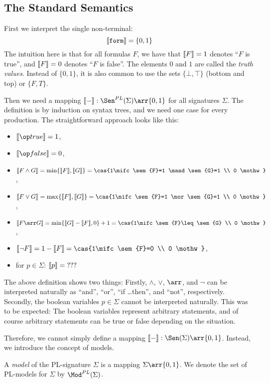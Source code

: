 \subsection{The Standard Semantics}

First we interpret the single non-terminal:
\[\llbracket \mathtt{form}\rrbracket=\{0,1\}\]
The intuition here is that for all formulas $F$, we have that $\llbracket F\rrbracket=1$ denotes ``$F$ is true'', and $\llbracket F\rrbracket=0$ denotes ``$F$ is false''. The elements $0$ and $1$ are called the \emph{truth values}. Instead of $\{0,1\}$, it is also common to use the sets $\{\bot,\top\}$ (bottom and top) or $\{F,T\}$.

Then we need a mapping $\sem{-}:\Sen^{PL}(\Sigma)\arr\{0,1\}$ for all signatures $\Sigma$. The definition is by induction on syntax trees, and we need one case for every production. The straightforward approach looks like this:
\begin{itemize}
\item $\sem{\true} = 1$,
\item $\sem{\false} = 0$,
\item $\sem{F\wedge G} = \min\{\sem{F},\sem{G}\} = \cas{1\mifc \sem{F}=1 \mand \sem{G}=1 \\ 0 \mothw}$,
\item $\sem{F\vee G} = \max\{\sem{F},\sem{G}\} = \cas{1\mifc \sem{F}=1 \mor \sem{G}=1 \\ 0 \mothw}$,
\item $\sem{F\arr G} = \min\{\sem{G}-\sem{F},0\}+1 = \cas{1\mifc \sem{F}\leq\sem{G} \\ 0 \mothw}$,
\item $\sem{\neg F} = 1-\sem{F} = \cas{1\mifc \sem{F}=0 \\ 0 \mothw}$,
\item for $p\in\Sigma$: $\llbracket p\rrbracket= \;???$
\end{itemize}

The above definition shows two things: Firstly, $\wedge$, $\vee$, $\arr$, and $\neg$ can be interpreted naturally as ``and'', ``or'', ``if \ldots then'', and ``not'', respectively. Secondly, the boolean variables $p\in\Sigma$ cannot be interpreted naturally. This was to be expected: The boolean variables represent arbitrary statements, and of course arbitrary statements can be true or false depending on the situation.
\medskip

Therefore, we cannot simply define a mapping $\sem{-}:\Sen(\Sigma)\arr\{0,1\}$. Instead, we introduce the concept of models.

\begin{definition}[Models]
A \emph{model} of the PL-signature $\Sigma$ is a mapping $\Sigma\arr\{0,1\}$.
We denote the set of PL-models for $\Sigma$ by $\Mod^{PL}(\Sigma)$.
\end{definition}

